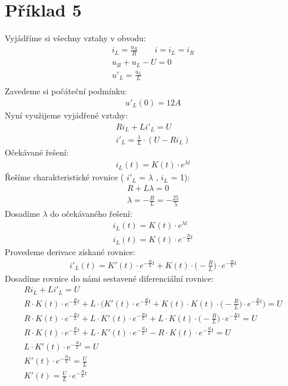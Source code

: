 \section{Příklad 5}
Vyjádříme si všechny vztahy v obvodu:\\
\begin{gather*}
	i_L = \frac{u_R}{R} \qquad i = i_L = i_R\\
    u_R + u_L - U = 0\\
    u'_{L} = \frac{u_L}{L}\\
\end{gather*}
Zavedeme si počáteční podmínku:\\
\begin{gather*}
    u'_{L}(0) = 12A
\end{gather*}
Nyní využijeme vyjádřené vztahy:\\
\begin{gather*}
    Ri_L + Li'_L = U\\
    i'_L = \frac{1}{L} \cdot (U - Ri_L) 
\end{gather*}
Očekávané řešení:\\
\begin{gather*}
    i_L(t) = K(t) \cdot e^{\lambda t}
\end{gather*}
Řešíme charakteristické rovnice ( ${i'_L}$ = ${\lambda}$ , ${i_L}$ = 1):\\
\begin{gather*}
    R + L \lambda = 0\\
    \lambda = -\frac{R}{L} = -\frac{25}{5}
\end{gather*}
Dosadíme ${ \lambda}$ do očekávaného řešení:\\
\begin{gather*}
    i_L(t) = K(t) \cdot e^{\lambda t}\\
    i_L(t) = K(t) \cdot e^{-\frac{R}{L} t}
\end{gather*}
Provedeme derivace získané rovnice:
\begin{gather*}
    i'_L(t) = K'(t) \cdot e^{-\frac{R}{L} t} + K(t) \cdot \bigg(-\frac{R}{L}\bigg) \cdot e^{-\frac{R}{L} t}
\end{gather*}
Dosadíme rovnice do námi sestavené diferenciální rovnice:
\begin{gather*}
    Ri_L + Li'_L = U\\
    R \cdot K(t) \cdot e^{-\frac{R}{L}t} + L \cdot \bigg(K'(t) \cdot e^{-\frac{R}{L}t} + K(t) \cdot K(t) \cdot \bigg(-\frac{R}{L}\bigg) \cdot e^{-\frac{R}{L}t} \bigg) = U\\
    R \cdot K(t) \cdot e^{-\frac{R}{L}t} + L \cdot K'(t) \cdot e^{-\frac{R}{L}t} + L \cdot K(t) \cdot \bigg(-\frac{R}{L}\bigg) \cdot e^{-\frac{R}{L}t} = U\\
    R \cdot K(t) \cdot e^{-\frac{R}{L}t} + L \cdot K'(t) \cdot e^{-\frac{R}{L}t} - R \cdot K(t) \cdot e^{-\frac{R}{L}t} = U\\
    L \cdot K'(t) \cdot e^{-\frac{R}{L}t} = U\\
    K'(t) \cdot e^{-\frac{R}{L}t} = \frac{U}{L}\\
    K'(t) = \frac{U}{L} \cdot e^{-\frac{R}{L}t}
\end{gather*}
